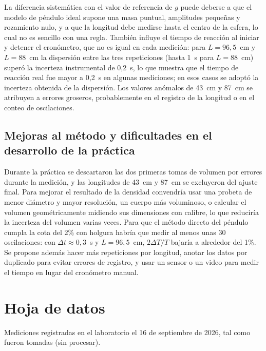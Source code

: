 \documentclass[12pt,a4paper]{article}
\renewcommand{\arraystretch}{1.15}
\begin{document}
La diferencia sistemática con el valor de referencia de $g$ puede deberse a que el modelo de
péndulo ideal supone una masa puntual, amplitudes pequeñas y rozamiento nulo, y a que la
longitud debe medirse hasta el centro de la esfera, lo cual no es sencillo con una regla.
También influye el tiempo de reacción al iniciar y detener el cronómetro, que no es igual en
cada medición: para $L = 96{,}5$~cm y $L = 88$~cm la dispersión entre las tres repeticiones
(hasta 1~s para $L = 88$~cm) superó la incerteza instrumental de 0,2~s, lo que muestra que
el tiempo de reacción real fue mayor a 0,2~s en algunas mediciones; en esos casos se adoptó
la incerteza obtenida de la dispersión. Los valores anómalos de 43~cm y
87~cm se atribuyen a errores groseros, probablemente en el registro de la longitud o en el
conteo de oscilaciones.

\subsection{Mejoras al método y dificultades en el desarrollo de la práctica}
Durante la práctica se descartaron las dos primeras tomas de volumen por errores durante la
medición, y las longitudes de 43~cm y 87~cm se excluyeron del ajuste final. Para mejorar el
resultado de la densidad convendría usar una probeta de menor diámetro y mayor resolución, un
cuerpo más voluminoso, o calcular el volumen geométricamente midiendo sus dimensiones con
calibre, lo que reduciría la incerteza del volumen varias veces. Para que el método directo
del péndulo cumpla la cota del 2\% con holgura habría que medir al menos unas 30
oscilaciones: con $\Delta t \approx 0{,}3$~s y $L = 96{,}5$~cm, $2\Delta T/T$ bajaría a
alrededor del 1\%. Se propone además hacer
más repeticiones por longitud, anotar los datos por duplicado para evitar errores de registro,
y usar un sensor o un video para medir el tiempo en lugar del cronómetro manual.

\section{Hoja de datos}
Mediciones registradas en el laboratorio el 16 de septiembre de 2026, tal como fueron
tomadas (sin procesar).

\begingroup
\small
\renewcommand{\arraystretch}{1.3}
\setlength{\aboverulesep}{0pt}\setlength{\belowrulesep}{0pt}
\newcommand{\hojatitulo}[1]{%
  \par\vspace{14pt}\noindent{\color{fiuba}\rule[-2pt]{3pt}{11pt}}\hspace{6pt}%
  \textbf{#1}\par\vspace{5pt}}
\newcommand{\hojahdr}{\rowcolor{fiuba!10}}
\end{document}

